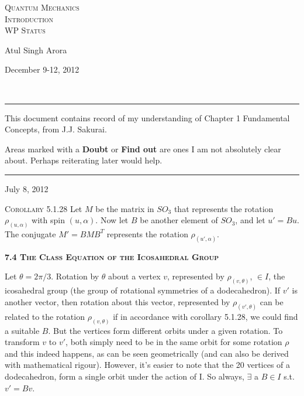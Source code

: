 \documentclass[12pt]{article}
\begin{document}



\begin{center}
\textsc{{\huge Quantum Mechanics\\}
Introduction\\
\small WP Status\\}
\begin{minipage}{0.4\textwidth}
\begin{flushleft} Atul Singh Arora \end{flushleft}
\end{minipage}
\begin{minipage}{0.4\textwidth}
\begin{flushright} {\small December 9-12, 2012} \end{flushright}
\end{minipage}
\\
\end{center}
\hrule
\vspace{12pt}
This document contains record of my understanding of Chapter 1 Fundamental Concepts, from J.J. Sakurai.
\par
Areas marked with a {\bf Doubt} or {\bf Find out} are ones I am not absolutely clear about. Perhaps reiterating later would help.\\
\hrule
\vspace{12pt}
\begin{flushright} {\small July 8, 2012} \end{flushright}
\par
\textsc{Corollary 5.1.28 } Let $M$ be the matrix in $SO_{3}$ that represents the rotation $\rho _{(u,\alpha)}$ with spin $(u,\alpha)$. Now let $B$ be another element of $SO_{3}$, and let $u' = Bu$. The conjugate $M'=BMB^{T}$ represents the rotation $\rho _{(u',\alpha)}$.\\
\par
\textbf {\textsc{7.4 The Class Equation of the Icosahedral Group}}
\par
Let $\theta=2\pi / 3$. Rotation by $\theta$ about a vertex $v$, represented by $\rho_{(v,\theta)}$, $\in I$, the icosahedral group (the group of rotational symmetries of a dodecahedron). If $v'$ is another vector, then rotation about this vector, represented by $\rho_{(v',\theta)}$ can be related to the rotation $\rho_{(v,\theta)}$ if in accordance with corollary 5.1.28, we could find a suitable $B$. But the vertices form different orbits under a given rotation. To transform $v$ to $v'$, both simply need to be in the same orbit for some rotation $\rho$ and this indeed happens, as can be seen geometrically (and can also be derived with mathematical rigour). However, it's easier to note that the 20 vertices of a dodecahedron, form a single orbit under the action of I. So always, $\exists$ a $B \in I$ s.t. $v'=Bv$.\\
\end{document}
